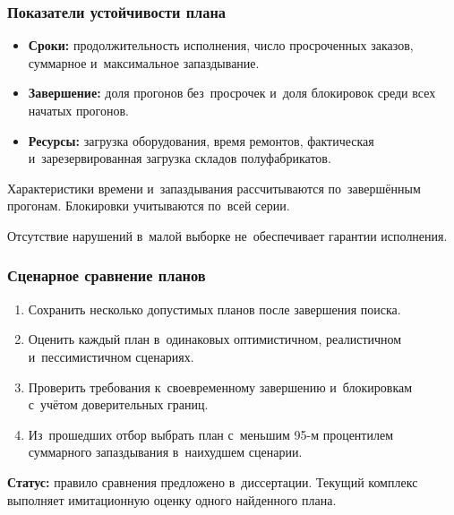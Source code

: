 \begin{frame}
    \frametitle{Показатели устойчивости плана}
    \begin{itemize}
        \item \textbf{Сроки:} продолжительность исполнения, число просроченных заказов, суммарное и~максимальное запаздывание.
        \item \textbf{Завершение:} доля прогонов без~просрочек и~доля блокировок среди всех начатых прогонов.
        \item \textbf{Ресурсы:} загрузка оборудования, время ремонтов, фактическая и~зарезервированная загрузка складов полуфабрикатов.
    \end{itemize}
    \vspace{0.3cm}
    Характеристики времени и~запаздывания рассчитываются по~завершённым прогонам. Блокировки учитываются по~всей серии.
    \vspace{0.2cm}

    Отсутствие нарушений в~малой выборке не~обеспечивает гарантии исполнения.
\end{frame}

\begin{frame}
    \frametitle{Сценарное сравнение планов}
    \begin{enumerate}
        \item Сохранить несколько допустимых планов после завершения поиска.
        \item Оценить каждый план в~одинаковых оптимистичном, реалистичном и~пессимистичном сценариях.
        \item Проверить требования к~своевременному завершению и~блокировкам с~учётом доверительных границ.
        \item Из~прошедших отбор выбрать план с~меньшим 95-м процентилем суммарного запаздывания в~наихудшем сценарии.
    \end{enumerate}
    \vspace{0.2cm}
    \textbf{Статус:} правило сравнения предложено в~диссертации. Текущий комплекс выполняет имитационную оценку одного найденного плана.
\end{frame}


